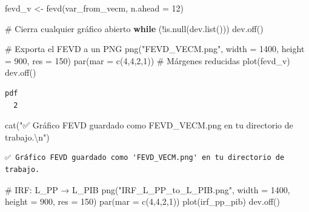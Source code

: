 \documentclass[
  spanish,
  letterpaper,
  DIV=11,
  numbers=noendperiod]{scrartcl}
\newenvironment{Shaded}{\begin{snugshade}}{\end{snugshade}}
\newcommand{\AttributeTok}[1]{\textcolor[rgb]{0.40,0.45,0.13}{#1}}
\newcommand{\CommentTok}[1]{\textcolor[rgb]{0.37,0.37,0.37}{#1}}
\newcommand{\ControlFlowTok}[1]{\textcolor[rgb]{0.00,0.23,0.31}{\textbf{#1}}}
\newcommand{\DecValTok}[1]{\textcolor[rgb]{0.68,0.00,0.00}{#1}}
\newcommand{\FunctionTok}[1]{\textcolor[rgb]{0.28,0.35,0.67}{#1}}
\newcommand{\NormalTok}[1]{\textcolor[rgb]{0.00,0.23,0.31}{#1}}
\newcommand{\OtherTok}[1]{\textcolor[rgb]{0.00,0.23,0.31}{#1}}
\newcommand{\SpecialCharTok}[1]{\textcolor[rgb]{0.37,0.37,0.37}{#1}}
\newcommand{\StringTok}[1]{\textcolor[rgb]{0.13,0.47,0.30}{#1}}
\begin{document}
\begin{Shaded}
\begin{Highlighting}[]
\NormalTok{fevd\_v }\OtherTok{\textless{}{-}} \FunctionTok{fevd}\NormalTok{(var\_from\_vecm, }\AttributeTok{n.ahead =} \DecValTok{12}\NormalTok{)}


\CommentTok{\# Cierra cualquier gráfico abierto}
\ControlFlowTok{while}\NormalTok{ (}\SpecialCharTok{!}\FunctionTok{is.null}\NormalTok{(}\FunctionTok{dev.list}\NormalTok{())) }\FunctionTok{dev.off}\NormalTok{()}

\CommentTok{\# Exporta el FEVD a un PNG}
\FunctionTok{png}\NormalTok{(}\StringTok{"FEVD\_VECM.png"}\NormalTok{, }\AttributeTok{width =} \DecValTok{1400}\NormalTok{, }\AttributeTok{height =} \DecValTok{900}\NormalTok{, }\AttributeTok{res =} \DecValTok{150}\NormalTok{)}
\FunctionTok{par}\NormalTok{(}\AttributeTok{mar =} \FunctionTok{c}\NormalTok{(}\DecValTok{4}\NormalTok{,}\DecValTok{4}\NormalTok{,}\DecValTok{2}\NormalTok{,}\DecValTok{1}\NormalTok{))  }\CommentTok{\# Márgenes reducidas}
\FunctionTok{plot}\NormalTok{(fevd\_v)}
\FunctionTok{dev.off}\NormalTok{()}
\end{Highlighting}
\end{Shaded}

\begin{verbatim}
pdf 
  2 
\end{verbatim}

\begin{Shaded}
\begin{Highlighting}[]
\FunctionTok{cat}\NormalTok{(}\StringTok{"✅ Gráfico FEVD guardado como \textquotesingle{}FEVD\_VECM.png\textquotesingle{} en tu directorio de trabajo.}\SpecialCharTok{\textbackslash{}n}\StringTok{"}\NormalTok{)}
\end{Highlighting}
\end{Shaded}

\begin{verbatim}
✅ Gráfico FEVD guardado como 'FEVD_VECM.png' en tu directorio de trabajo.
\end{verbatim}

\begin{Shaded}
\begin{Highlighting}[]
\CommentTok{\# IRF: L\_PP → L\_PIB}
\FunctionTok{png}\NormalTok{(}\StringTok{"IRF\_L\_PP\_to\_L\_PIB.png"}\NormalTok{, }\AttributeTok{width =} \DecValTok{1400}\NormalTok{, }\AttributeTok{height =} \DecValTok{900}\NormalTok{, }\AttributeTok{res =} \DecValTok{150}\NormalTok{)}
\FunctionTok{par}\NormalTok{(}\AttributeTok{mar =} \FunctionTok{c}\NormalTok{(}\DecValTok{4}\NormalTok{,}\DecValTok{4}\NormalTok{,}\DecValTok{2}\NormalTok{,}\DecValTok{1}\NormalTok{))}
\FunctionTok{plot}\NormalTok{(irf\_pp\_pib)}
\FunctionTok{dev.off}\NormalTok{()}
\end{Highlighting}
\end{Shaded}
\end{document}
